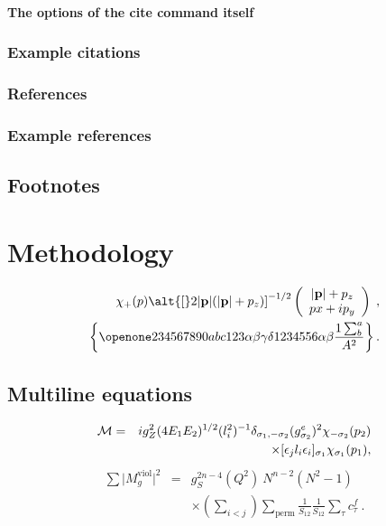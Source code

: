\documentclass[%
 reprint,
 amsmath,amssymb,
 aps,
 floatfix,
]{revtex4-2}
\begin{document}
\paragraph{The options of the cite command itself}


\subsubsection{Example citations}


\subsubsection{References}


\subsubsection{Example references}




\subsection{Footnotes}%

\section{Methodology}


\begin{eqnarray}
\chi_+(p)\alt{\bf [}2|{\bf p}|(|{\bf p}|+p_z){\bf ]}^{-1/2}
\left(
\begin{array}{c}
|{\bf p}|+p_z\\
px+ip_y
\end{array}\right)\;,
\\
\left\{%
 \openone234567890abc123\alpha\beta\gamma\delta1234556\alpha\beta
 \frac{1\sum^{a}_{b}}{A^2}%
\right\}%
\label{eq:one}.
\end{eqnarray}

\subsection{Multiline equations}

\begin{eqnarray}
{\cal M}=&&ig_Z^2(4E_1E_2)^{1/2}(l_i^2)^{-1}
\delta_{\sigma_1,-\sigma_2}
(g_{\sigma_2}^e)^2\chi_{-\sigma_2}(p_2)\nonumber\\
&&\times
[\epsilon_jl_i\epsilon_i]_{\sigma_1}\chi_{\sigma_1}(p_1),
\end{eqnarray}
\begin{eqnarray}
\sum \vert M^{\text{viol}}_g \vert ^2&=&g^{2n-4}_S(Q^2)~N^{n-2}
        (N^2-1)\nonumber \\
 & &\times \left( \sum_{i<j}\right)
  \sum_{\text{perm}}
 \frac{1}{S_{12}}
 \frac{1}{S_{12}}
 \sum_\tau c^f_\tau~.
\end{eqnarray}
\end{document}
